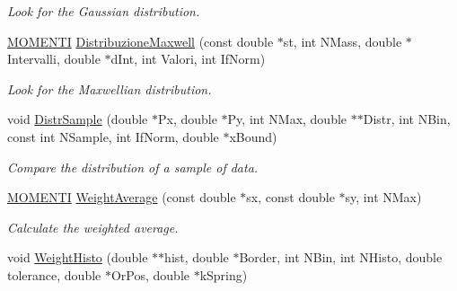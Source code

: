 \begin{DoxyCompactItemize}
\begin{DoxyCompactList}\small\item\em \-Look for the \-Gaussian distribution. \end{DoxyCompactList}\item 
\hypertarget{classMatematica_afbd5fb94779d51392400156cd2210035}{\hyperlink{structMOMENTI}{\-M\-O\-M\-E\-N\-T\-I} \hyperlink{classMatematica_afbd5fb94779d51392400156cd2210035}{\-Distribuzione\-Maxwell} (const double $\ast$st, int \-N\-Mass, double $\ast$\-Intervalli, double $\ast$d\-Int, int \-Valori, int \-If\-Norm)}\label{classMatematica_afbd5fb94779d51392400156cd2210035}

\begin{DoxyCompactList}\small\item\em \-Look for the \-Maxwellian distribution. \end{DoxyCompactList}\item 
\hypertarget{classMatematica_ab160279d67e4266427d7de4983249bd4}{void \hyperlink{classMatematica_ab160279d67e4266427d7de4983249bd4}{\-Distr\-Sample} (double $\ast$\-Px, double $\ast$\-Py, int \-N\-Max, double $\ast$$\ast$\-Distr, int \-N\-Bin, const int \-N\-Sample, int \-If\-Norm, double $\ast$x\-Bound)}\label{classMatematica_ab160279d67e4266427d7de4983249bd4}

\begin{DoxyCompactList}\small\item\em \-Compare the distribution of a sample of data. \end{DoxyCompactList}\item 
\hypertarget{classMatematica_a54768724636e1877a0f515037f9c1dfd}{\hyperlink{structMOMENTI}{\-M\-O\-M\-E\-N\-T\-I} \hyperlink{classMatematica_a54768724636e1877a0f515037f9c1dfd}{\-Weight\-Average} (const double $\ast$sx, const double $\ast$sy, int \-N\-Max)}\label{classMatematica_a54768724636e1877a0f515037f9c1dfd}

\begin{DoxyCompactList}\small\item\em \-Calculate the weighted average. \end{DoxyCompactList}\item 
\hypertarget{classMatematica_abfe1241dc3eb4896ae7e45cf740aebde}{void \hyperlink{classMatematica_abfe1241dc3eb4896ae7e45cf740aebde}{\-Weight\-Histo} (double $\ast$$\ast$hist, double $\ast$\-Border, int \-N\-Bin, int \-N\-Histo, double tolerance, double $\ast$\-Or\-Pos, double $\ast$k\-Spring)}\label{classMatematica_abfe1241dc3eb4896ae7e45cf740aebde}


\end{DoxyCompactItemize}
